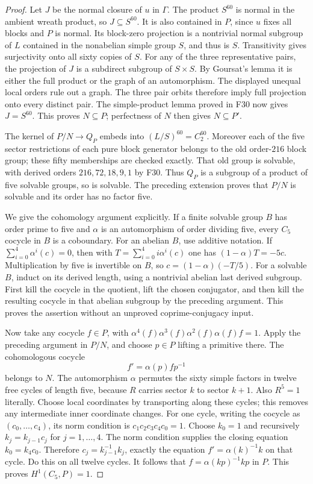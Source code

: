 \begin{proof}
Let $J$ be the normal closure of $u$ in $\Gamma$. The product
$S^{60}$ is normal in the ambient wreath product, so
$J\subseteq S^{60}$. It is also contained in $P$, since $u$
fixes all blocks and $P$ is normal. Its block-zero projection
is a nontrivial normal subgroup of $L$ contained in the
nonabelian simple group $S$, and thus is $S$. Transitivity
gives surjectivity onto all sixty copies of $S$.
For any of the three representative pairs, the projection of
$J$ is a subdirect subgroup of $S\times S$. By Goursat's lemma
it is either the full product or the graph of an automorphism.
The displayed unequal local orders rule out a graph.
The three pair orbits therefore imply full projection onto
every distinct pair. The simple-product lemma proved in F30
now gives $J=S^{60}$. This proves $N\subseteq P$; perfectness
of $N$ then gives $N\subseteq P'$.

The kernel of $P/N\to Q_P$ embeds into $(L/S)^{60}=C_2^{60}$.
Moreover each of the five sector restrictions of each pure
block generator belongs to the old order-$216$ block group;
these fifty memberships are checked exactly. That old group
is solvable, with derived orders $216,72,18,9,1$ by F30.
Thus $Q_P$ is a subgroup of a product of five solvable groups,
so is solvable. The preceding extension proves that $P/N$ is
solvable and its order has no factor five.

We give the cohomology argument explicitly. If a finite
solvable group $B$ has order prime to five and $\alpha$ is an
automorphism of order dividing five, every $C_5$ cocycle in
$B$ is a coboundary. For an abelian $B$, use additive notation.
If $\sum_{i=0}^4\alpha^i(c)=0$, then with
$T=\sum_{i=0}^4 i\alpha^i(c)$ one has
$(1-\alpha)T=-5c$. Multiplication by five is invertible on
$B$, so $c=(1-\alpha)(-T/5)$. For a solvable $B$, induct on
its derived length, using a nontrivial abelian last derived
subgroup. First kill the cocycle in the quotient, lift the
chosen conjugator, and then kill the resulting cocycle in
that abelian subgroup by the preceding argument. This proves
the assertion without an unproved coprime-conjugacy input.

Now take any cocycle $f\in P$, with
$\alpha^4(f)\alpha^3(f)\alpha^2(f)\alpha(f)f=1$.
Apply the preceding argument in $P/N$, and choose $p\in P$
lifting a primitive there. The cohomologous cocycle
\[
                          f'=\alpha(p)fp^{-1}
\]
belongs to $N$. The automorphism $\alpha$ permutes the sixty
simple factors in twelve free cycles of length five, because
$R$ carries sector $k$ to sector $k+1$. Also $R^5=1$ literally.
Choose local coordinates by transporting along these cycles;
this removes any intermediate inner coordinate changes.
For one cycle, writing the cocycle as $(c_0,\ldots,c_4)$, its
norm condition is $c_1c_2c_3c_4c_0=1$.
Choose $k_0=1$ and recursively $k_j=k_{j-1}c_j$ for
$j=1,\ldots,4$. The norm condition supplies the closing
equation $k_0=k_4c_0$. Therefore
$c_j=k_{j-1}^{-1}k_j$, exactly the equation
$f'=\alpha(k)^{-1}k$ on that cycle. Do this on all twelve
cycles. It follows that $f=\alpha(kp)^{-1}kp$ in $P$.
This proves $H^1(C_5,P)=1$.


\end{proof}
